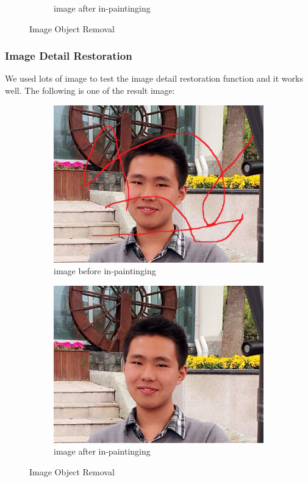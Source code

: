 \documentclass[12pt]{article}
\begin{document}
\begin{figure}[H]
\begin{subfigure}[pos]{.5\textwidth}
		\caption{image after in-paintinging}
	\end{subfigure}%
	\caption{Image Object Removal}
\end{figure}
\subsubsection*{Image Detail Restoration}
\qquad We used lots of image to test the image detail restoration function and it works well. The following is one of the result image:
\begin{figure}[H]
	\begin{subfigure}[pos]{.5\textwidth}
		\centering
		\includegraphics*[width=0.8\linewidth]{zouyikai.png}
		\caption{image before in-paintinging}
	\end{subfigure}%
	\begin{subfigure}[pos]{.5\textwidth}
		\centering
		\includegraphics*[width=0.8\linewidth]{zouyikai_result.png}
		\caption{image after in-paintinging}
	\end{subfigure}%
	\caption{Image Object Removal}
\end{figure}
\end{document}
